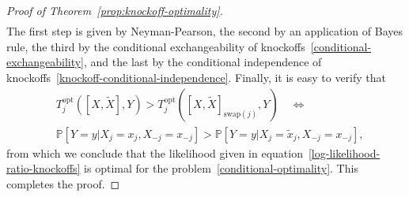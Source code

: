 \documentclass[ejs]{imsart}
\numberwithin{equation}{section}
\theoremstyle{plain}
\theoremstyle{definition}
\theoremstyle{remark}
\newcommand{\srx}{X}
\newcommand{\sfx}{x}
\newcommand{\srxk}{\widetilde X}
\newcommand{\sfxk}{\widetilde x}
\newcommand{\sry}{Y}
\newcommand{\sfy}{y}
\begin{document}
\begin{proof}[Proof of Theorem~\ref{prop:knockoff-optimality}]
\begin{equation*}
\begin{split}
	\end{split}
	\end{equation*}
	The first step is given by Neyman-Pearson, the second by an application of Bayes rule, the third by the conditional exchangeability of knockoffs~\eqref{conditional-exchangeability}, and the last by the conditional independence of knockoffs~\eqref{knockoff-conditional-independence}. Finally, it is easy to verify that
	\begin{equation*}
	\begin{split}
	&T_j^{\text{opt}}([\srx, \srxk], \sry) > T_j^{\text{opt}}([\srx, \srxk]_{\text{swap}(j)}, \sry) \quad \Longleftrightarrow \\
	& \mathbb P[\sry = \sfy|\srx_j = \sfx_j, \srx_{-j} = \sfx_{-j}] >  \mathbb P[\sry = \sfy|\srx_j = \sfxk_j, \srx_{-j} = \sfx_{-j}],
	\end{split}
	\end{equation*}
	from which we conclude that the likelihood given in equation~\eqref{log-likelihood-ratio-knockoffs} is optimal for the problem~\eqref{conditional-optimality}. This completes the proof.
\end{proof}
\end{document}
